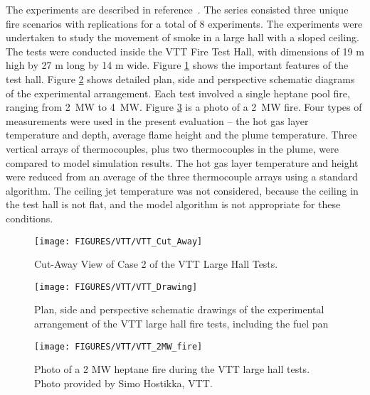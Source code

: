 The experiments are described in reference~\cite{Hostikka:2001}. The series consisted three unique fire scenarios with replications for a total of 8 experiments. The experiments were undertaken to study the movement of smoke in a large hall with a sloped ceiling. The tests were conducted inside the VTT Fire Test Hall, with dimensions of 19 m high by 27 m long by 14 m wide. Figure \ref{fig:VTT_cutaway} shows the important features of the test hall. Figure \ref{fig:VTT_Schematic} shows detailed plan, side and perspective schematic diagrams of the experimental arrangement. Each test involved a single heptane pool fire, ranging from 2~MW to 4~MW. Figure \ref{fig:VTT_2MW_fire} is a photo of a 2~MW fire. Four types of measurements were used in the present evaluation -- the hot gas layer temperature and depth, average flame height and the plume temperature. Three vertical arrays of thermocouples, plus two thermocouples in the plume, were compared to model simulation results. The hot gas layer temperature and height were reduced from an average of the three thermocouple arrays using a standard algorithm. The ceiling jet temperature was not considered, because the ceiling in the test hall is not flat, and the model algorithm is not appropriate for these conditions.

\begin{figure}[\figoptions{b}]
\begin{center}
\texttt{[image: FIGURES/VTT/VTT\_Cut\_Away]}\\
\end{center}
\caption{Cut-Away View of Case 2 of the VTT Large Hall Tests.}
 \label{fig:VTT_cutaway}
\end{figure}

\begin{figure}[\figoptions{b}]
\begin{center}
\texttt{[image: FIGURES/VTT/VTT\_Drawing]}\\
\end{center}
\caption{Plan, side and perspective schematic drawings of the experimental arrangement of the VTT large hall fire tests, including the fuel pan}
 \label{fig:VTT_Schematic}
\end{figure}

\begin{figure}[\figoptions{b}]
\begin{center}
\texttt{[image: FIGURES/VTT/VTT\_2MW\_fire]}\\
\end{center}
\caption{Photo of a 2 MW heptane fire during the VTT large hall tests. Photo provided by Simo Hostikka, VTT.}
 \label{fig:VTT_2MW_fire}
\end{figure}

